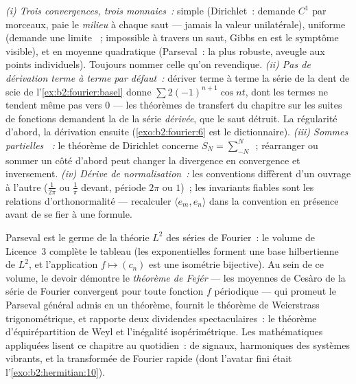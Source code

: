 \begin{remark}
\emph{(i) Trois convergences, trois monnaies~:} simple (Dirichlet~:
demande $C^1$ par morceaux, paie le \emph{milieu} à chaque saut ---
jamais la valeur unilatérale), uniforme (demande une limite ~;
impossible à travers un saut, Gibbs en est le symptôme visible), et
en moyenne quadratique (Parseval~: la plus robuste, aveugle aux points
individuels). Toujours nommer celle qu'on revendique. \emph{(ii) Pas
de dérivation terme à terme par défaut~:} dériver terme à terme la
série de la dent de scie de l'\cref{ex:b2:fourier:basel} donne $\sum
2(-1)^{n+1}\cos nt$, dont les termes ne tendent même pas vers $0$ ---
les théorèmes de transfert du chapitre sur les suites de fonctions
demandent la  de la série \emph{dérivée}, que le
saut détruit. La régularité d'abord, la dérivation ensuite
(\cref{exo:b2:fourier:6} est le dictionnaire). \emph{(iii) Sommes
partielles ~:} le théorème de Dirichlet concerne $S_N =
\sum_{-N}^{N}$~; réarranger ou sommer un côté d'abord peut changer
la divergence en convergence et inversement. \emph{(iv) Dérive de
normalisation~:} les conventions diffèrent d'un ouvrage à l'autre
($\frac{1}{2\pi}$ ou $\frac1\pi$ devant, période $2\pi$ ou $1$)~; les
invariants fiables sont les relations d'orthonormalité --- recalculer
$\langle e_m, e_n\rangle$ dans la convention en présence avant de se
fier à une formule.
\end{remark}

\begin{remark}
Parseval est le germe de la théorie $L^2$ des séries de Fourier~: le
volume de Licence~3 complète le tableau (les exponentielles forment
une base hilbertienne de $L^2$, et l'application $f \mapsto (c_n)$ est
une isométrie bijective). Au sein de ce volume, le devoir démontre le
\emph{théorème de Fejér} --- les moyennes de Cesàro de la série de
Fourier convergent  pour toute fonction $f$ 
périodique --- qui promeut le Parseval général admis en un théorème,
fournit le théorème de Weierstrass trigonométrique, et rapporte deux
dividendes spectaculaires~: le théorème d'équirépartition de Weyl et
l'inégalité isopérimétrique. Les mathématiques appliquées lisent ce
chapitre au quotidien~:  de signaux, harmoniques des systèmes
vibrants, et la transformée de Fourier rapide (dont l'avatar fini
était l'\cref{exo:b2:hermitian:10}).
\end{remark}

